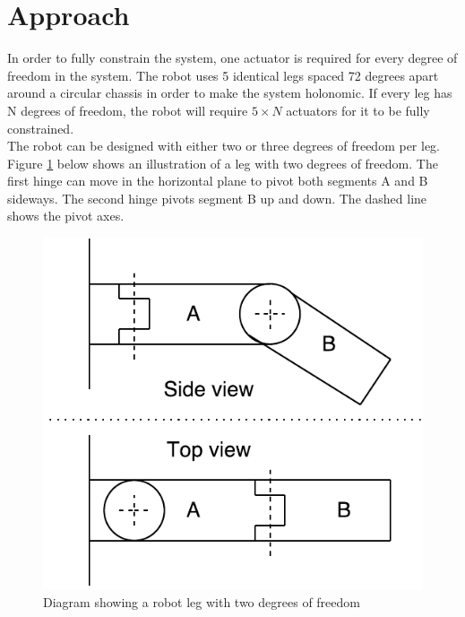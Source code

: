 
\section{Approach}
In order to fully constrain the system, one actuator is required for every degree of freedom in the system. The robot uses 5 identical legs spaced 72 degrees apart around a circular chassis in order to make the system holonomic. If every leg has N degrees of freedom, the robot will require $5 \times N$ actuators for it to be fully constrained.\\

The robot can be designed with either two or three degrees of freedom per leg. Figure \ref{fig:2DOF} below shows an illustration of a leg with two degrees of freedom. The first hinge can move in the horizontal plane to pivot both segments A and B sideways. The second hinge pivots segment B up and down. The dashed line shows the pivot axes.

\FloatBarrier
\begin{figure}[H]
    \centering
        \includegraphics[scale=0.8]{pics/EPR400-2DOF.pdf}
    \caption{Diagram showing a robot leg with two degrees of freedom}
    \label{fig:2DOF}
\end{figure}
\FloatBarrier

